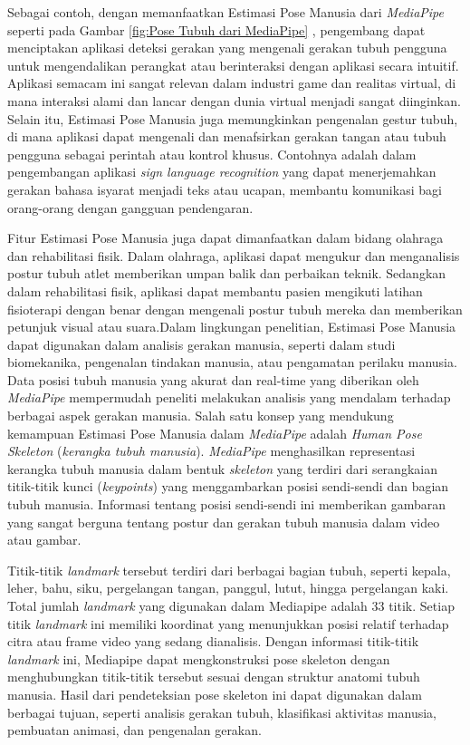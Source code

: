 Sebagai contoh, dengan memanfaatkan Estimasi Pose Manusia dari \textit{MediaPipe} seperti pada Gambar \ref{fig:Pose Tubuh dari MediaPipe} , pengembang dapat menciptakan aplikasi deteksi gerakan yang mengenali gerakan tubuh pengguna untuk mengendalikan perangkat atau berinteraksi dengan aplikasi secara intuitif. Aplikasi semacam ini sangat relevan dalam industri game dan realitas virtual, di mana interaksi alami dan lancar dengan dunia virtual menjadi sangat diinginkan. Selain itu, Estimasi Pose Manusia juga memungkinkan pengenalan gestur tubuh, di mana aplikasi dapat mengenali dan menafsirkan gerakan tangan atau tubuh pengguna sebagai perintah atau kontrol khusus. Contohnya adalah dalam pengembangan aplikasi \textit{sign language recognition} yang dapat menerjemahkan gerakan bahasa isyarat menjadi teks atau ucapan, membantu komunikasi bagi orang-orang dengan gangguan pendengaran. \cite{singh2021real}

Fitur Estimasi Pose Manusia juga dapat dimanfaatkan dalam bidang olahraga dan rehabilitasi fisik. Dalam olahraga, aplikasi dapat mengukur dan menganalisis postur tubuh atlet memberikan umpan balik dan perbaikan teknik. Sedangkan dalam rehabilitasi fisik, aplikasi dapat membantu pasien mengikuti latihan fisioterapi dengan benar dengan mengenali postur tubuh mereka dan memberikan petunjuk visual atau suara.Dalam lingkungan penelitian, Estimasi Pose Manusia dapat digunakan dalam analisis gerakan manusia, seperti dalam studi biomekanika, pengenalan tindakan manusia, atau pengamatan perilaku manusia. Data posisi tubuh manusia yang akurat dan real-time yang diberikan oleh \textit{MediaPipe} mempermudah peneliti melakukan analisis yang mendalam terhadap berbagai aspek gerakan manusia. Salah satu konsep yang mendukung kemampuan Estimasi Pose Manusia dalam \textit{MediaPipe} adalah \textit{Human Pose Skeleton} (\textit{kerangka tubuh manusia}). \textit{MediaPipe} menghasilkan representasi kerangka tubuh manusia dalam bentuk \textit{skeleton} yang terdiri dari serangkaian titik-titik kunci (\textit{keypoints}) yang menggambarkan posisi sendi-sendi dan bagian tubuh manusia. Informasi tentang posisi sendi-sendi ini memberikan gambaran yang sangat berguna tentang postur dan gerakan tubuh manusia dalam video atau gambar. 

Titik-titik \textit{landmark} tersebut terdiri dari berbagai bagian tubuh, seperti kepala, leher, bahu, siku, pergelangan tangan, panggul, lutut, hingga pergelangan kaki. Total jumlah \textit{landmark} yang digunakan dalam Mediapipe adalah 33 titik. Setiap titik \textit{landmark} ini memiliki koordinat yang menunjukkan posisi relatif terhadap citra atau frame video yang sedang dianalisis. Dengan informasi titik-titik \textit{landmark} ini, Mediapipe dapat mengkonstruksi pose skeleton dengan menghubungkan titik-titik tersebut sesuai dengan struktur anatomi tubuh manusia. Hasil dari pendeteksian pose skeleton ini dapat digunakan dalam berbagai tujuan, seperti analisis gerakan tubuh, klasifikasi aktivitas manusia, pembuatan animasi, dan pengenalan gerakan.

